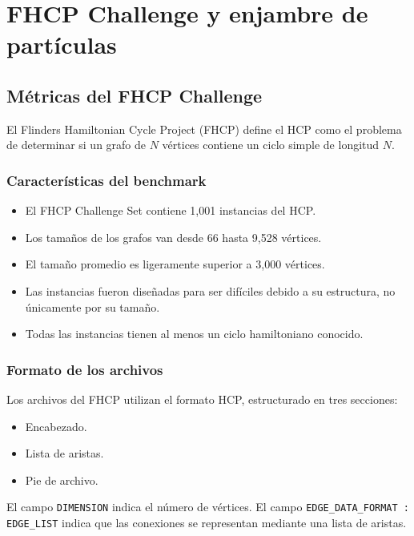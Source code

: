 \chapter{FHCP Challenge y enjambre de partículas}
\section{Métricas del FHCP Challenge}

El Flinders Hamiltonian Cycle Project (FHCP) define el HCP como el problema de determinar si un grafo de \(N\) vértices contiene un ciclo simple de longitud \(N\). \cite{de2}

\subsection{Características del benchmark}

\begin{itemize}
    \item El FHCP Challenge Set contiene 1{,}001 instancias del HCP. \cite{aco9}
    \item Los tamaños de los grafos van desde 66 hasta 9{,}528 vértices. \cite{aco9}
    \item El tamaño promedio es ligeramente superior a 3{,}000 vértices. \cite{aco9}
    \item Las instancias fueron diseñadas para ser difíciles debido a su estructura, no únicamente por su tamaño. \cite{de2}
    \item Todas las instancias tienen al menos un ciclo hamiltoniano conocido. \cite{de2}
\end{itemize}

\subsection{Formato de los archivos}

Los archivos del FHCP utilizan el formato HCP, estructurado en tres secciones:

\begin{itemize}
    \item Encabezado.
    \item Lista de aristas.
    \item Pie de archivo.
\end{itemize}

El campo \texttt{DIMENSION} indica el número de vértices. El campo \texttt{EDGE\_DATA\_FORMAT : EDGE\_LIST} indica que las conexiones se representan mediante una lista de aristas. \cite{aco9}

